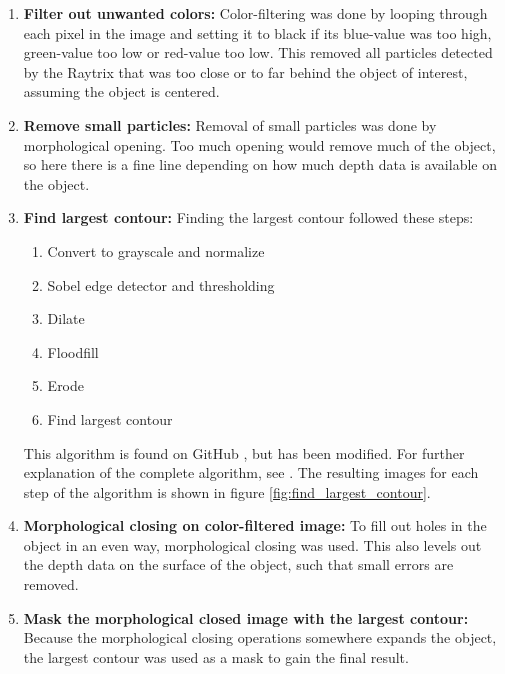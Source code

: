 \begin{enumerate}
    \item \textbf{Filter out unwanted colors:}
    Color-filtering was done by looping through each pixel in the image and setting it to black if its blue-value was too high, green-value too low or red-value too low. This removed all particles detected by the Raytrix that was too close or to far behind the object of interest, assuming the object is centered.
    
    \item \textbf{Remove small particles:}
    Removal of small particles was done by morphological opening. Too much opening would remove much of the object, so here there is a fine line depending on how much depth data is available on the object.
    
    \item \textbf{Find largest contour:} 
    Finding the largest contour followed these steps: 
    \begin{enumerate}[label*=\arabic*.]
        \item Convert to grayscale and normalize
        \item Sobel edge detector and thresholding
        \item Dilate
        \item Floodfill
        \item Erode
        \item Find largest contour
    \end{enumerate}
    This algorithm is found on GitHub \cite{website:largest_contour_code_github}, but has been modified. For further explanation of the complete algorithm, see \cite{website:largest_contour_code_explanation}.
    The resulting images for each step of the algorithm is shown in figure \ref{fig:find_largest_contour}.
    
    \item \textbf{Morphological closing on color-filtered image:}
    To fill out holes in the object in an even way, morphological closing was used. This also levels out the depth data on the surface of the object, such that small errors are removed.
    
    \item \textbf{Mask the morphological closed image with the largest contour:}
    Because the morphological closing operations somewhere expands the object, the largest contour was used as a mask to gain the final result. 
\end{enumerate}

